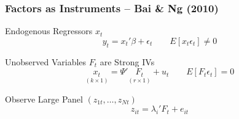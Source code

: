 \documentclass[handout]{beamer}
\begin{document}
\begin{frame}[c]\frametitle{Factors as Instruments -- Bai \& Ng (2010)}
\begin{block}
   	{Endogenous Regressors $x_t$}
$$y_t = x_t' \beta + \epsilon_t \quad \quad E[x_t\epsilon_t] \neq 0 $$
\end{block}   

 \begin{block}
 	{Unobserved Variables $F_t$ are Strong IVs}
$$\underset{(k\times 1)}{x_t} = \Psi'\underset{(r\times 1)}{F_t} + u_t \quad \quad E[F_t \epsilon_t] = 0$$
 \end{block}

\begin{block}
	{Observe Large Panel $(z_{1t}, \hdots, z_{Nt})$}
		$$z_{it} = \lambda_i' F_t + e_{it}$$
\end{block}

\end{frame}

\end{document}
